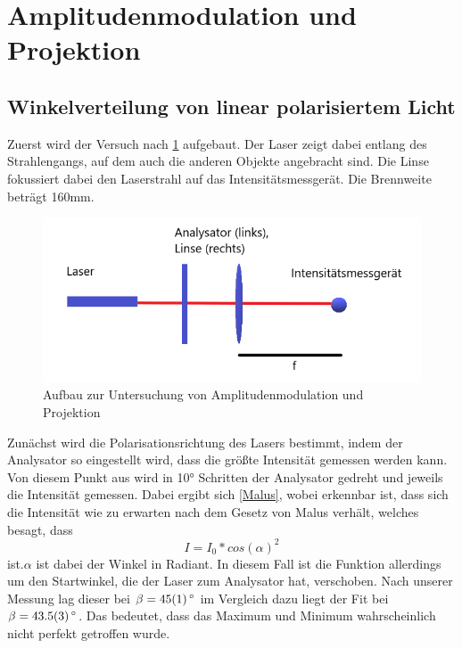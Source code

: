\section{Amplitudenmodulation und Projektion}
\subsection{Winkelverteilung von linear polarisiertem Licht}
Zuerst wird der Versuch nach \cref{411} aufgebaut. Der Laser zeigt dabei entlang des Strahlengangs, auf dem auch die anderen Objekte angebracht sind. Die Linse fokussiert dabei den Laserstrahl auf das Intensitätsmessgerät.
Die Brennweite beträgt 160mm. 

\begin{figure}[h!]
	\centering
	\includegraphics[scale=1]{4.1.1-Aufbau.png}
	\caption{Aufbau zur Untersuchung von Amplitudenmodulation und Projektion}
	\label{411}
\end{figure}

Zunächst wird die Polarisationsrichtung des Lasers bestimmt, indem der Analysator so eingestellt wird, dass die größte Intensität gemessen werden kann. Von diesem Punkt aus wird in 10° Schritten der Analysator gedreht und jeweils die Intensität gemessen. Dabei ergibt sich \cref{Malus}, wobei erkennbar ist, dass  sich die Intensität wie zu erwarten nach dem Gesetz von Malus verhält, welches besagt, dass 
\begin{equation}
	I = I_{0}*cos(\alpha)^{2}
\end{equation}
ist.$\alpha$ ist dabei der Winkel in Radiant. In diesem Fall ist die Funktion allerdings um den Startwinkel, die der Laser zum Analysator hat, verschoben.
Nach unserer Messung lag dieser bei $\beta = \SI{45 \pm 1}{^\circ}$ im Vergleich dazu liegt der Fit bei $\beta = \SI{43,5 \pm 0,3}{^\circ}$. Das bedeutet, dass das Maximum und Minimum wahrscheinlich nicht perfekt getroffen wurde.

